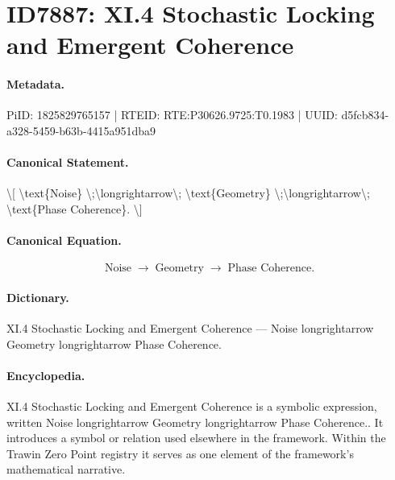 \section*{ID7887: XI.4 Stochastic Locking and Emergent Coherence}
\paragraph{Metadata.}
PiID: 1825829765157 | RTEID: RTE:P30626.9725:T0.1983 | UUID: d5fcb834-a328-5459-b63b-4415a951dba9

\paragraph{Canonical Statement.}
\textbackslash{}[ \textbackslash{}text\{Noise\} \textbackslash{};\textbackslash{}longrightarrow\textbackslash{}; \textbackslash{}text\{Geometry\} \textbackslash{};\textbackslash{}longrightarrow\textbackslash{}; \textbackslash{}text\{Phase Coherence\}. \textbackslash{}]

\paragraph{Canonical Equation.}
\[
\text{Noise} \;\longrightarrow\; \text{Geometry} \;\longrightarrow\; \text{Phase Coherence}.
\]

\paragraph{Dictionary.}
XI.4 Stochastic Locking and Emergent Coherence — Noise longrightarrow Geometry longrightarrow Phase Coherence.

\paragraph{Encyclopedia.}
XI.4 Stochastic Locking and Emergent Coherence is a symbolic expression, written Noise longrightarrow Geometry longrightarrow Phase Coherence.. It introduces a symbol or relation used elsewhere in the framework. Within the Trawin Zero Point registry it serves as one element of the framework's mathematical narrative.
